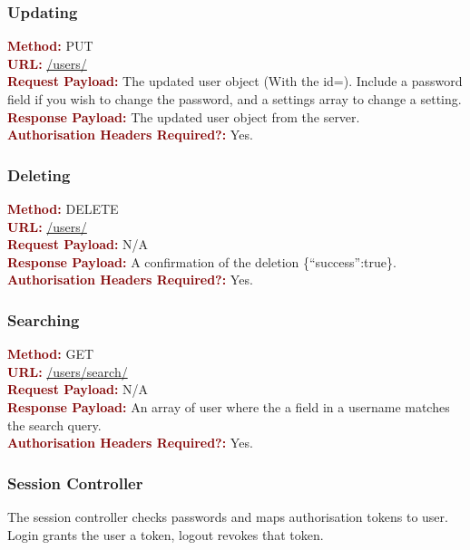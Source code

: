 \documentclass[11pt,a4paper]{report}
\begin{document}
\subsubsection{Updating}
\textbf{\textcolor{Maroon}{Method:}} PUT\\
\textbf{\textcolor{Maroon}{URL:}} \url{/users/}\\
\textbf{\textcolor{Maroon}{Request Payload:}} The updated user object (With the id=). Include a password field if you wish to change the password, and a settings array to change a setting.\\
\textbf{\textcolor{Maroon}{Response Payload:}} The updated user object from the server.\\
\textbf{\textcolor{Maroon}{Authorisation Headers Required?:}} Yes.

\subsubsection{Deleting}
\textbf{\textcolor{Maroon}{Method:}} DELETE\\
\textbf{\textcolor{Maroon}{URL:}} \url{/users/}\\
\textbf{\textcolor{Maroon}{Request Payload:}} N/A\\
\textbf{\textcolor{Maroon}{Response Payload:}} A confirmation of the deletion \{``success'':true\}.\\
\textbf{\textcolor{Maroon}{Authorisation Headers Required?:}} Yes.

\subsubsection{Searching}
\textbf{\textcolor{Maroon}{Method:}} GET\\
\textbf{\textcolor{Maroon}{URL:}} \url{/users/search/}\\
\textbf{\textcolor{Maroon}{Request Payload:}} N/A\\
\textbf{\textcolor{Maroon}{Response Payload:}} An array of user where the a field in a username matches the search query.\\
\textbf{\textcolor{Maroon}{Authorisation Headers Required?:}} Yes.

\subsubsection{Session Controller}

The session controller checks passwords and maps authorisation tokens to user. Login grants the user a token, logout revokes that token. 
\end{document}
